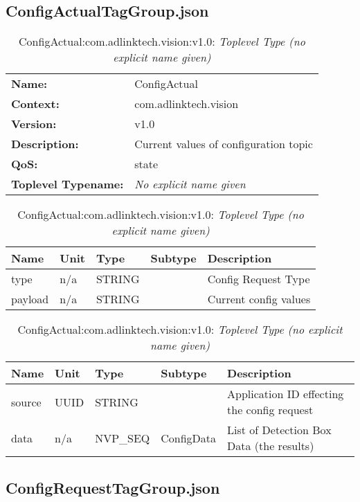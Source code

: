 \subsection{ConfigActualTagGroup.json}

\begin{table}[H]
\begin{tabularx}{\textwidth}{l X} 
       \textbf{Name:} & ConfigActual \\ 
	   \textbf{Context:} & com.adlinktech.vision \\ 
	   \textbf{Version:} & v1.0 \\ 
	   \textbf{Description:} & Current values of configuration topic \\ 
	   \textbf{QoS:} & state \\
	   \textbf{Toplevel Typename:} & \textit{No explicit name given} \\ 
\end{tabularx}
\caption{ConfigActual:com.adlinktech.vision:v1.0}\label{ConfigActualTagGroup.json:table:ConfigActual}
\bigskip
\begin{tabularx}{\textwidth}{l l l l X} 
	 \textbf{Name} & \textbf{Unit} & \textbf{Type} & \textbf{Subtype} & \textbf{Description} \\
	 \midrule
   type & n/a & STRING &  & Config Request Type \\
   payload & n/a & STRING &  & Current config values \\
\end{tabularx}
\caption{ConfigActual:com.adlinktech.vision:v1.0: ConfigData}\label{ConfigActualTagGroup.json:table:ConfigActual-ConfigData}

\bigskip
\begin{tabularx}{\textwidth}{l l l l X} 
	 \textbf{Name} & \textbf{Unit} & \textbf{Type} & \textbf{Subtype} & \textbf{Description} \\
	 \midrule
   source & UUID & STRING &  & Application ID effecting the config request \\
   data & n/a & NVP\_SEQ & ConfigData & List of Detection Box Data (the results) \\
\end{tabularx}
\caption{ConfigActual:com.adlinktech.vision:v1.0: \textit{Toplevel Type (no explicit name given)}}\label{ConfigActualTagGroup.json:table:ConfigActual-no-type-given}


\end{table}

\subsection{ConfigRequestTagGroup.json}

